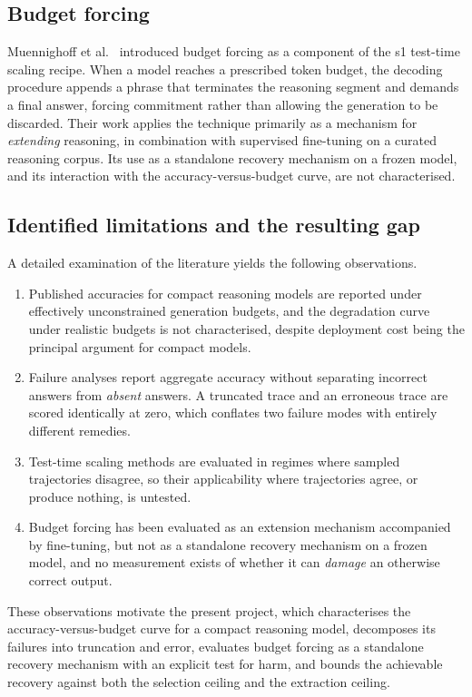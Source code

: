 \documentclass[12pt,a4paper,oneside]{report}
\begin{document}
\subsection*{Budget forcing}

Muennighoff et al.\ \cite{s1} introduced budget forcing as a component of the s1
test-time scaling recipe. When a model reaches a prescribed token budget, the
decoding procedure appends a phrase that terminates the reasoning segment and
demands a final answer, forcing commitment rather than allowing the generation to
be discarded. Their work applies the technique primarily as a mechanism for
\emph{extending} reasoning, in combination with supervised fine-tuning on a
curated reasoning corpus. Its use as a standalone recovery mechanism on a frozen
model, and its interaction with the accuracy-versus-budget curve, are not
characterised.

\subsection*{Identified limitations and the resulting gap}

A detailed examination of the literature yields the following observations.
\begin{enumerate}[label=(\roman*)]
\item Published accuracies for compact reasoning models are reported under
effectively unconstrained generation budgets, and the degradation curve under
realistic budgets is not characterised, despite deployment cost being the
principal argument for compact models.
\item Failure analyses report aggregate accuracy without separating incorrect
answers from \emph{absent} answers. A truncated trace and an erroneous trace are
scored identically at zero, which conflates two failure modes with entirely
different remedies.
\item Test-time scaling methods are evaluated in regimes where sampled
trajectories disagree, so their applicability where trajectories agree, or
produce nothing, is untested.
\item Budget forcing has been evaluated as an extension mechanism accompanied by
fine-tuning, but not as a standalone recovery mechanism on a frozen model, and
no measurement exists of whether it can \emph{damage} an otherwise correct
output.
\end{enumerate}

These observations motivate the present project, which characterises the
accuracy-versus-budget curve for a compact reasoning model, decomposes its
failures into truncation and error, evaluates budget forcing as a standalone
recovery mechanism with an explicit test for harm, and bounds the achievable
recovery against both the selection ceiling and the extraction ceiling.
\end{document}
